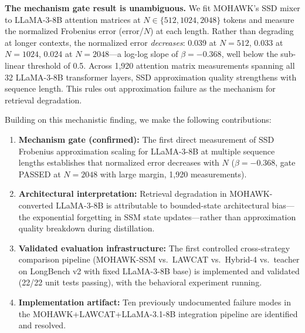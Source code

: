 \textbf{The mechanism gate result is unambiguous.} We fit MOHAWK's SSD mixer to LLaMA-3-8B
attention matrices at $N \in \{512, 1024, 2048\}$ tokens and measure the normalized Frobenius
error (error/$N$) at each length. Rather than degrading at longer contexts, the normalized error
\emph{decreases}: 0.039 at $N=512$, 0.033 at $N=1024$, 0.024 at $N=2048$---a log-log slope of
$\beta=-0.368$, well below the sub-linear threshold of 0.5. Across 1,920 attention matrix
measurements spanning all 32 LLaMA-3-8B transformer layers, SSD approximation quality strengthens
with sequence length. This rules out approximation failure as the mechanism for retrieval
degradation.

Building on this mechanistic finding, we make the following contributions:

\begin{enumerate}
  \item \textbf{Mechanism gate (confirmed):} The first direct measurement of SSD Frobenius
    approximation scaling for LLaMA-3-8B at multiple sequence lengths establishes that normalized
    error decreases with $N$ ($\beta=-0.368$, gate PASSED at $N=2048$ with large margin,
    1,920 measurements).

  \item \textbf{Architectural interpretation:} Retrieval degradation in MOHAWK-converted
    LLaMA-3-8B is attributable to bounded-state architectural bias---the exponential forgetting
    in SSM state updates---rather than approximation quality breakdown during distillation.

  \item \textbf{Validated evaluation infrastructure:} The first controlled cross-strategy
    comparison pipeline (MOHAWK-SSM vs.\ LAWCAT vs.\ Hybrid-4 vs.\ teacher on LongBench v2
    with fixed LLaMA-3-8B base) is implemented and validated (22/22 unit tests passing),
    with the behavioral experiment running.

  \item \textbf{Implementation artifact:} Ten previously undocumented failure modes in the
    MOHAWK+LAWCAT+LLaMA-3.1-8B integration pipeline are identified and resolved.
\end{enumerate}
